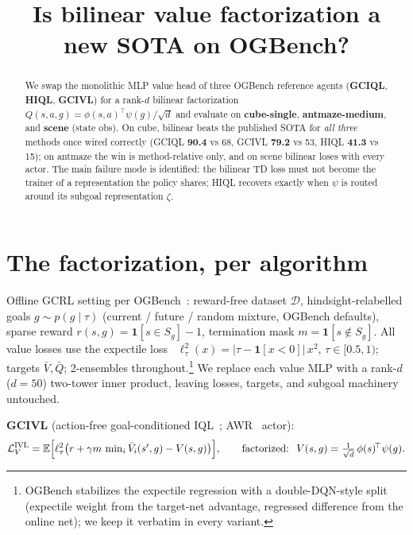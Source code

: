 \documentclass[11pt]{article}
\title{\bf Is bilinear value factorization a new SOTA on OGBench?}
\newcommand{\B}[1]{\textbf{#1}}
\newcommand{\loc}[1]{\textcolor{locgreen}{#1}}
\newcommand{\pub}[1]{\textcolor{puborange}{#1}}
\newcommand{\win}[1]{\B{\loc{#1}}}   %
\begin{document}
\maketitle

\begin{abstract}
We swap the monolithic MLP value head of three OGBench reference agents
(\B{GCIQL}, \B{HIQL}, \B{GCIVL}) for a rank-$d$ bilinear factorization
$Q(s,a,g)=\phi(s,a)^{\!\top}\psi(g)/\sqrt{d}$ and evaluate on \B{cube-single},
\B{antmaze-medium}, and \B{scene} (state obs). On cube, bilinear beats the
published SOTA for \emph{all three} methods once wired correctly (GCIQL
\win{90.4} vs \pub{68}, GCIVL \win{79.2} vs \pub{53}, HIQL \win{41.3} vs
\pub{15}); on antmaze the win is method-relative only, and on scene bilinear
loses with every actor. The main failure mode is identified: the bilinear TD
loss must not become the trainer of a representation the policy shares;
HIQL recovers exactly when $\psi$ is routed around its subgoal representation
$\zeta$.
\end{abstract}

\section{The factorization, per algorithm}
\label{sec:setup}
Offline GCRL setting per OGBench~\cite{park2025ogbench}: reward-free dataset
$\mathcal{D}$, hindsight-relabelled goals $g\sim p(g\mid\tau)$ (current / future
/ random mixture, OGBench defaults), sparse reward
$r(s,g)=\mathbf{1}[s\in S_g]-1$, termination mask $m=\mathbf{1}[s\notin S_g]$.
All value losses use the expectile loss~\cite{kostrikov2022iql}
$\ell^2_\tau(x)=|\tau-\mathbf{1}[x<0]|\,x^2$, $\tau\in[0.5,1)$; targets $\bar
V,\bar Q$; 2-ensembles throughout.\footnote{OGBench stabilizes the expectile
regression with a double-DQN-style split (expectile weight from the target-net
advantage, regressed difference from the online net); we keep it verbatim in
every variant.} We replace each value MLP with a rank-$d$ ($d{=}50$) two-tower
inner product, leaving losses, targets, and subgoal machinery untouched.

\B{GCIVL} (action-free goal-conditioned IQL~\cite{park2023hiql}; AWR~\cite{peng2019awr} actor):
\begin{equation}
\mathcal{L}_{V}^{\text{IVL}}
=\mathbb{E}\Bigl[\ell^2_\tau\bigl(r+\gamma m\,
\textstyle\min_i \bar V_i(s',g)-V(s,g)\bigr)\Bigr],
\qquad\text{factorized: }\;
V(s,g)=\tfrac{1}{\sqrt d}\,\phi(s)^{\!\top}\psi(g).
\label{eq:ivl}
\end{equation}
\end{document}
